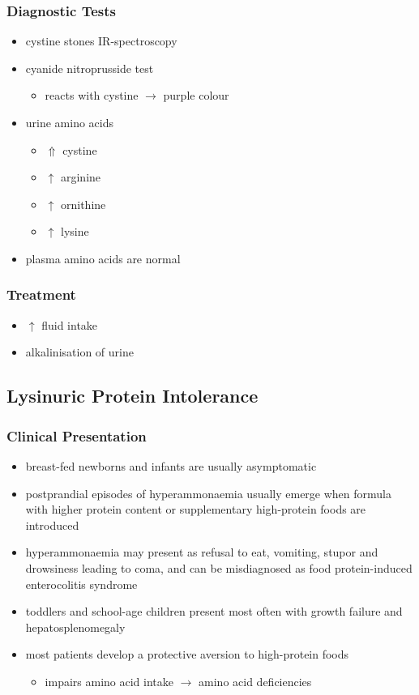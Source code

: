 \documentclass{scrartcl}
\begin{document}
\subsubsection{Diagnostic Tests}
\label{sec:org82dad95}
\begin{itemize}
\item cystine stones IR-spectroscopy
\item cyanide nitroprusside test
\begin{itemize}
\item reacts with cystine \(\to\) purple colour
\end{itemize}
\item urine amino acids
\begin{itemize}
\item \(\Uparrow\) cystine
\item \(\uparrow\) arginine
\item \(\uparrow\) ornithine
\item \(\uparrow\) lysine
\end{itemize}
\item plasma amino acids are normal
\end{itemize}
\subsubsection{Treatment}
\label{sec:org465f268}
\begin{itemize}
\item \(\uparrow\) fluid intake
\item alkalinisation of urine
\end{itemize}

\subsection{Lysinuric Protein Intolerance}
\label{sec:org995768e}
\subsubsection{Clinical Presentation}
\label{sec:orgb1a3642}
\begin{itemize}
\item breast-fed newborns and infants are usually
asymptomatic
\item postprandial episodes of hyperammonaemia usually emerge when formula
with higher protein content or supplementary high-protein foods are
introduced
\item hyperammonaemia may present as refusal to eat, vomiting, stupor and
drowsiness leading to coma, and can be misdiagnosed as food
protein-induced enterocolitis syndrome
\item toddlers and school-age children present most often with growth
failure and hepatosplenomegaly
\item most patients develop a protective aversion to high-protein foods
\begin{itemize}
\item impairs amino acid intake \(\to\) amino acid deficiencies
\end{itemize}
\end{itemize}
\end{document}
